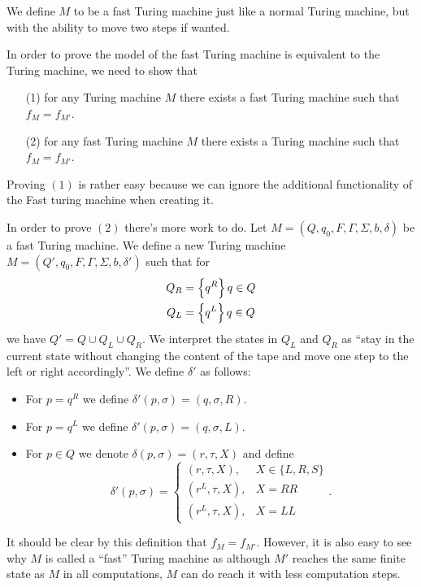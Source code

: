 \documentclass[11pt,a4paper]{article}
\begin{document}
  \begin{example}
    We define $M$ to be a fast Turing machine just like a normal Turing 
    machine, but with the ability to move two steps if wanted.

    In order to prove the model of the fast Turing machine is equivalent
    to the Turing machine, we need to show that
    \begin{enumerate}
      \item[(1)] for any Turing machine $M$ there exists a fast Turing machine
        such that $f_M = f_{M'}$.
      \item[(2)] for any fast Turing machine $M$ there exists a Turing machine
        such that $f_M = f_{M'}$.
    \end{enumerate}
    Proving $(1)$ is rather easy because we can ignore the additional
    functionality of the Fast turing machine when creating it.

    In order to prove $(2)$ there's more work to do.
    Let $M = (Q,q_0,F,\Gamma,\Sigma,b,\delta)$ be a fast Turing machine.
    We define a new Turing machine $M = (Q',q_0,F,\Gamma,\Sigma,b,\delta')$
    such that for
    \begin{align*}
      Q_R &= \set{q^R}{q \in Q} \\
      Q_L &= \set{q^L}{q \in Q}
    \end{align*}
    we have $Q' = Q \cup Q_L \cup Q_R$.
    We interpret the states in $Q_L$ and $Q_R$ as ``stay in the current state
    without changing the content of the tape and move one step to the left
    or right accordingly''.
    We define $\delta'$ as follows:
    \begin{itemize}
      \item For $p = q^R$ we define $\delta'(p,\sigma) = (q,\sigma,R)$.
      \item For $p = q^L$ we define $\delta'(p,\sigma) = (q,\sigma,L)$.
      \item For $p \in Q$ we denote $\delta(p,\sigma) = (r,\tau,X)$ and
        define
        \[
          \delta'(p,\sigma) =
          \begin{cases}
            (r,\tau,X), &X \in \{L,R,S\} \\
            (r^L,\tau,X), &X = RR \\
            (r^L,\tau,X), &X = LL
          \end{cases}.
        \]
    \end{itemize}
    It should be clear by this definition that $f_M = f_{M'}$.
    However, it is also easy to see why $M$ is called a ``fast'' Turing
    machine as although $M'$ reaches the same finite state as $M$ in
    all computations, $M$ can do reach it with less computation steps.
  \end{example}
\end{document}

